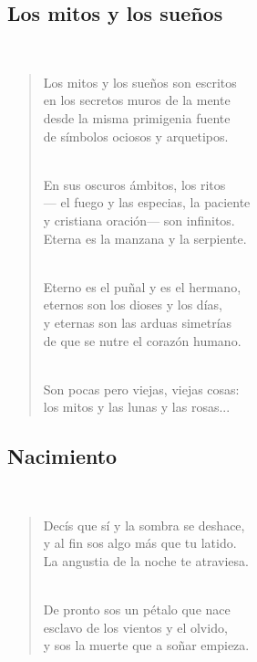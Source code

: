 \documentclass[a4paper, 12pt]{article}
\begin{document}
\pagebreak
\subsection{Los mitos y los sueños}
~ 

\begin{verse}
    
Los mitos y los sueños son escritos\\
en los secretos muros de la mente\\
desde la misma primigenia fuente\\
de símbolos ociosos y arquetipos.\\
~ 

En sus oscuros ámbitos, los ritos\\
— el fuego y las especias, la paciente\\
y cristiana oración— son infinitos.\\
Eterna es la manzana y la serpiente.\\
~ 

Eterno es el puñal y es el hermano,\\
eternos son los dioses y los días,\\
y eternas son las arduas simetrías\\
de que se nutre el corazón humano.\\
~ 

Son pocas pero viejas, viejas cosas:\\
los mitos y las lunas y las rosas...\\
\end{verse}

\pagebreak 

\subsection{Nacimiento}
~ 
\begin{verse}
    
Decís que sí y la sombra se deshace,\\
y al fin sos algo más que tu latido.\\
La angustia de la noche te atraviesa.\\
~ 

De pronto sos un pétalo que nace\\
esclavo de los vientos y el olvido,\\
y sos la muerte que a soñar empieza.\\
\end{verse}
\end{document}
